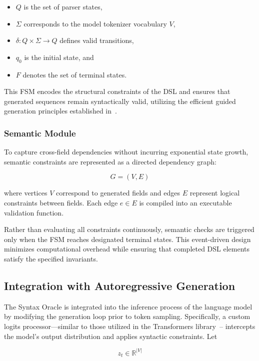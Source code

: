 \begin{itemize}
\item $Q$ is the set of parser states,
\item $\Sigma$ corresponds to the model tokenizer vocabulary $V$,
\item $\delta : Q \times \Sigma \rightarrow Q$ defines valid transitions,
\item $q_0$ is the initial state, and
\item $F$ denotes the set of terminal states.
\end{itemize}

This FSM encodes the structural constraints of the DSL and ensures that 
generated sequences remain syntactically valid, utilizing the efficient guided generation 
principles established in~\cite{willard2023efficient}.

\subsubsection{Semantic Module}
To capture cross-field dependencies without incurring exponential state 
growth, semantic constraints are represented as a directed dependency graph:

\begin{equation}
G = (V, E)
\end{equation}

where vertices $V$ correspond to generated fields and edges $E$ represent 
logical constraints between fields. Each edge $e \in E$ is compiled into 
an executable validation function.

Rather than evaluating all constraints continuously, semantic checks are 
triggered only when the FSM reaches designated terminal states. This 
event-driven design minimizes computational overhead while ensuring that 
completed DSL elements satisfy the specified invariants.

\subsection{Integration with Autoregressive Generation}
The Syntax Oracle is integrated into the inference process of the language 
model by modifying the generation loop prior to token sampling. Specifically, 
a custom logits processor---similar to those utilized in the Transformers library~\cite{wolf2020transformers}--
intercepts the model's output distribution and 
applies syntactic constraints. Let

\begin{equation}
z_t \in \mathbb{R}^{|V|}
\end{equation}

